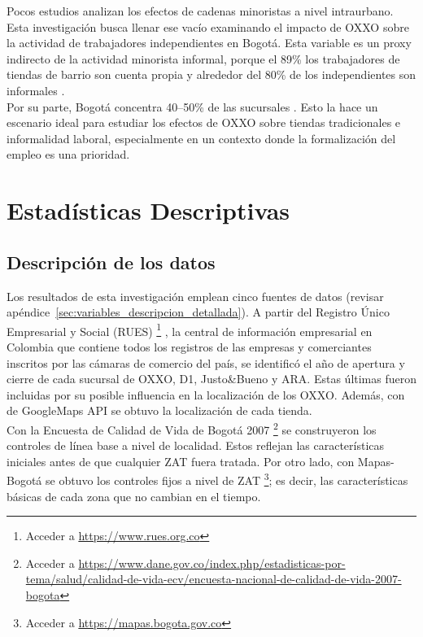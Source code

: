 \documentclass{article}
\begin{document}
Pocos estudios analizan los efectos de cadenas minoristas a nivel intraurbano. Esta investigación busca llenar ese vacío examinando el impacto de OXXO sobre la actividad de trabajadores independientes en Bogotá. Esta variable es un proxy indirecto de la actividad minorista informal, porque el 89\% los trabajadores de tiendas de barrio son cuenta propia \parencite{DANE2025a} y alrededor del 80\% de los independientes son informales \parencite{llanes2025}. \\

Por su parte, Bogotá concentra 40–50\% de las sucursales \parencite{godoy2025}. Esto la hace un escenario ideal para estudiar los efectos de OXXO sobre tiendas tradicionales e informalidad laboral, especialmente en un contexto donde la formalización del empleo es una prioridad.\\

\section{Estadísticas Descriptivas} 

\subsection{Descripción de los datos}
Los resultados de esta investigación emplean cinco fuentes de datos  (revisar apéndice~\ref{sec:variables_descripcion_detallada}). A partir del Registro Único Empresarial y Social (RUES) \footnote{Acceder a \url{ https://www.rues.org.co}} , la central de información empresarial en Colombia que contiene todos los registros de las empresas y comerciantes inscritos por las cámaras de comercio del país, se identificó el año de apertura y cierre de cada sucursal de OXXO, D1, Justo\&Bueno y ARA.
Estas últimas fueron incluidas por su posible influencia en la localización de los OXXO. Además, con de GoogleMaps API se obtuvo la localización de cada tienda. \\

Con la Encuesta de Calidad de Vida de Bogotá 2007 \footnote{Acceder a \url{https://www.dane.gov.co/index.php/estadisticas-por-tema/salud/calidad-de-vida-ecv/encuesta-nacional-de-calidad-de-vida-2007-bogota}} se construyeron los controles de línea base a nivel de localidad. Estos reflejan las características iniciales antes de que cualquier ZAT fuera tratada. 
Por otro lado, con Mapas-Bogotá se obtuvo los controles fijos a nivel de ZAT \footnote{Acceder a \url{https://mapas.bogota.gov.co}}; es decir, las características básicas de cada zona que no cambian en el tiempo. \\
\end{document}
